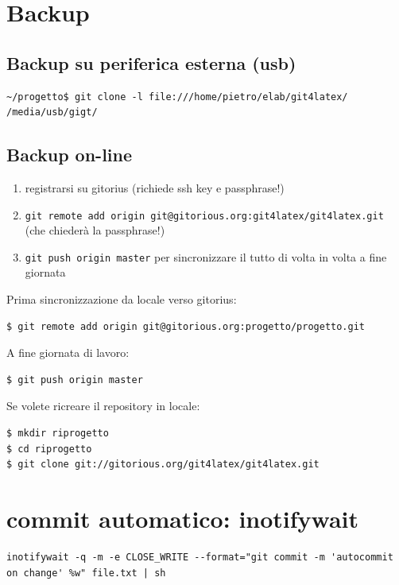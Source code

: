 \documentclass[a4paper,12pt,oneside]{article}
\begin{document}
\section{Backup}
\subsection{Backup su periferica esterna (usb)}
\begin{lstlisting}
~/progetto$ git clone -l file:///home/pietro/elab/git4latex/ /media/usb/gigt/
\end{lstlisting}

\subsection{Backup on-line}
\label{sec:backup-on-line}

\begin{enumerate}
\item registrarsi su gitorius (richiede ssh key e passphrase!)
\item \lstinline|git remote add origin git@gitorious.org:git4latex/git4latex.git|
  (che chiederà la passphrase!)
\item \lstinline|git push origin master|
  per sincronizzare il tutto di volta in volta a fine giornata
\end{enumerate}

Prima sincronizzazione da locale verso gitorius:
\begin{lstlisting}
$ git remote add origin git@gitorious.org:progetto/progetto.git
\end{lstlisting}

A fine giornata di lavoro:
\begin{lstlisting}
$ git push origin master
\end{lstlisting}

Se volete ricreare il repository in locale:
\begin{lstlisting}
$ mkdir riprogetto
$ cd riprogetto
$ git clone git://gitorious.org/git4latex/git4latex.git
\end{lstlisting}

\section{commit automatico: inotifywait}

\begin{lstlisting}
inotifywait -q -m -e CLOSE_WRITE --format="git commit -m 'autocommit on change' %w" file.txt | sh
\end{lstlisting}
\end{document}
